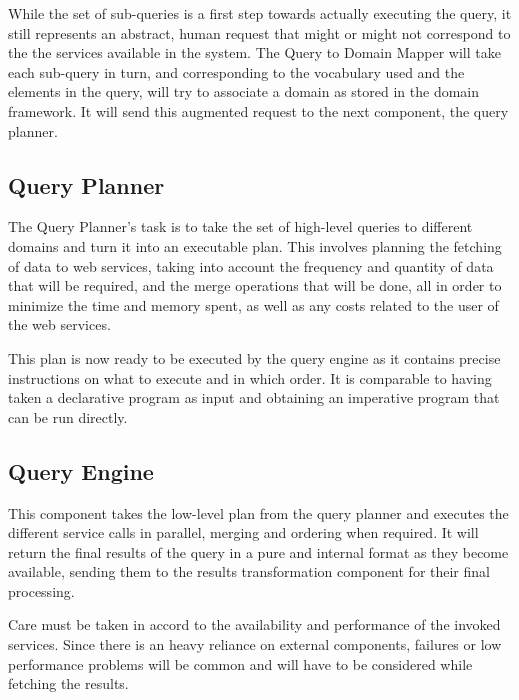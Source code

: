While the set of sub-queries is a first step towards actually executing the query, it still represents an abstract, human request that might or might not correspond to the the services available in the system. The Query to Domain Mapper will take each sub-query in turn, and corresponding to the vocabulary used and the elements in the query, will try to associate a domain as stored in the domain framework. It will send this augmented request to the next component, the query planner.


\subsection{Query Planner} %
\label{sub:query_planner}

The Query Planner's task is to take the set of high-level queries to different domains and turn it into an executable plan. This involves planning the fetching of data to web services, taking into account the frequency and quantity of data that will be required, and the merge operations that will be done, all in order to minimize the time and memory spent, as well as any costs related to the user of the web services.

This plan is now ready to be executed by the query engine as it contains precise instructions on what to execute and in which order. It is comparable to having taken a declarative program as input and obtaining an imperative program that can be run directly.


\subsection{Query Engine} %
\label{sub:query_engine}
This component takes the low-level plan from the query planner and executes the different service calls in parallel, merging and ordering when required. It will return the final results of the query in a pure and internal format as they become available, sending them to the results transformation component for their final processing.

Care must be taken in accord to the availability and performance of the invoked services. Since there is an heavy reliance on external components, failures or low performance problems will be common and will have to be considered while fetching the results.

